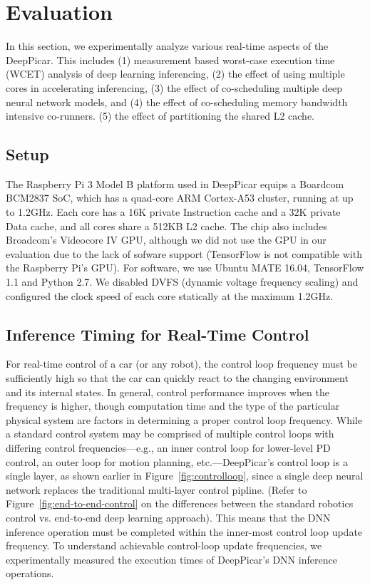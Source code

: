 
\section{Evaluation}\label{sec:evaluation}

In this section, we experimentally analyze various real-time aspects
of the DeepPicar. This includes
(1) measurement based worst-case execution time (WCET) analysis of
deep learning inferencing,
(2) the effect of using multiple cores in accelerating inferencing,
(3) the effect of co-scheduling multiple deep neural network models,
and 
(4) the effect of co-scheduling memory bandwidth intensive co-runners.
(5) the effect of partitioning the shared L2 cache.

\subsection{Setup}

The Raspberry Pi 3 Model B platform used in DeepPicar equips a Boardcom
BCM2837 SoC, which has a quad-core ARM Cortex-A53 cluster,
running at up to 1.2GHz. Each core has a 16K private Instruction cache
and a 32K private Data cache, and all cores share a 512KB L2 cache.
The chip also includes Broadcom's Videocore IV
GPU, although we did not use the GPU in our evaluation due to the lack
of sofware support (TensorFlow is not compatible with the Raspberry Pi's GPU).
For software, we use Ubuntu MATE 16.04, TensorFlow 1.1 and Python
2.7. We disabled DVFS (dynamic voltage frequency scaling) and
configured the clock speed of each core statically at the maximum 1.2GHz.

\subsection{Inference Timing for Real-Time Control}

For real-time control of a car (or any robot), the control loop
frequency must be sufficiently high so that the car can quickly
react to the changing environment and its internal states. In general,
control performance improves when the frequency is higher, though
computation time and the type of the particular physical system are
factors in determining a proper control loop frequency. While a standard
control system may be comprised of multiple control loops with
differing control frequencies---e.g., an inner control loop for lower-level
PD control, an outer loop for motion planning, etc.---DeepPicar's
control loop is a single layer, as shown earlier in
Figure~\ref{fig:controlloop}, since a single deep neural network
replaces the traditional multi-layer control pipline. (Refer to
Figure~\ref{fig:end-to-end-control} on the differences between the
standard robotics control vs. end-to-end deep learning approach).
This means that the DNN inference operation must be completed
within the inner-most control loop update frequency. To understand
achievable control-loop update frequencies, we experimentally measured
the execution times of DeepPicar's DNN inference operations.

